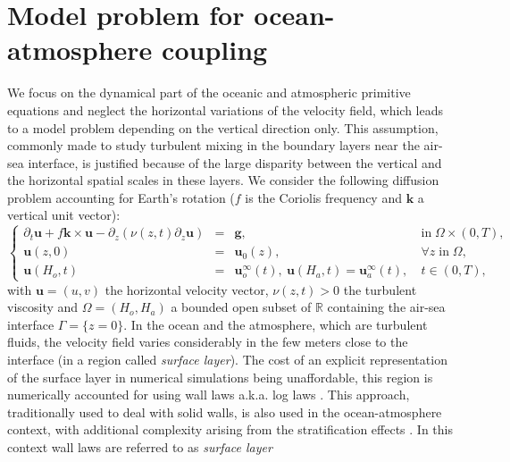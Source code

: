 \section{Model problem for ocean-atmosphere coupling}\label{sec:couplingProblem}
We focus on the dynamical part of the oceanic and atmospheric primitive equations and neglect the horizontal variations of 
the velocity field, which leads to a model problem  depending 
on the vertical direction only. This assumption, commonly made 
to study turbulent mixing in the boundary layers near the 
air-sea interface, is justified because of the large disparity 
between the vertical and the horizontal spatial scales in these layers. 
We consider the following diffusion problem accounting for Earth’s 
rotation ($f$ is the Coriolis frequency and $\mathbf{k}$ a vertical unit vector):
\begin{equation*}
\left\{
\begin{array}{rcll}
\partial_t \mathbf{u} + f \mathbf{k} \times \mathbf{u} - \partial_z \left( \nu(z,t) \partial_z \mathbf{u} \right) &=& \mathbf{g}, & \mbox{in}\;\Omega \times (0,T), \\
\mathbf{u}(z,0) &=& \mathbf{u}_0(z), & \forall z \; \mbox{in}\; \Omega, \\
\mathbf{u}(H_o,t) &=& \mathbf{u}_o^\infty(t), ~ \mathbf{u}(H_a,t) = \mathbf{u}_a^\infty(t), ~ & t \in (0,T),  
\end{array}
\right.
\end{equation*}
with $\mathbf{u} = (u,v)$ the horizontal velocity vector,
$\nu(z,t) > 0$ the turbulent viscosity and 
$\Omega = (H_o,H_a)$ a bounded open subset of $\mathbb{R}$
containing the air-sea interface $\Gamma = \{z = 0\}$.
In the ocean and the atmosphere, which are  turbulent fluids,
the velocity field varies considerably in the few 
meters close to the interface (in a region called 
\textit{surface layer}). The cost of an
explicit representation of the surface layer in numerical simulations being 
unaffordable, this region is numerically accounted for 
using wall laws a.k.a. log laws \cite[e.g.][]{mohammadi_rough_1998}. This approach, 
traditionally used to deal with solid walls, is also used
in the ocean-atmosphere context, with additional complexity 
arising from the stratification effects \cite[e.g.][]{pelletier_two-sided_2021}.
In this context wall laws are referred to as \textit{surface layer} 

